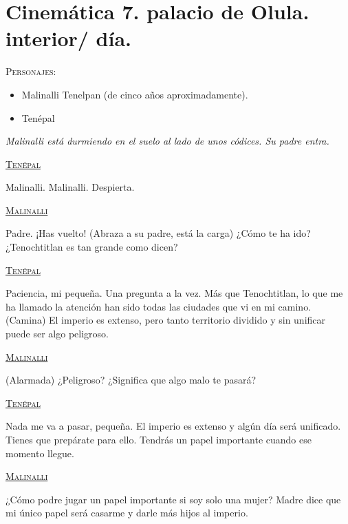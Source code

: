 \section{Cinemática 7. palacio de Olula. interior/ día.}
\label{Cin:Cinematica07}
\textsc{Personajes}:
\begin{itemize}
 \item Malinalli Tenelpan (de cinco años aproximadamente).
	\item Tenépal
\end{itemize}

\textit{Malinalli está durmiendo en el suelo al lado de unos códices. Su padre entra.} 

\begin{center}
\textsc{\underline{Tenépal }}
\\
\par
Malinalli. Malinalli. Despierta. 
\\
\par
\textsc{\underline{Malinalli}}
\\
\par
Padre. ¡Has vuelto! (Abraza a su padre, está la carga) ¿Cómo te ha ido? ¿Tenochtitlan es tan grande como dicen?
\\
\par 
\textsc{\underline{Tenépal }}
\\
\par
Paciencia, mi pequeña. Una pregunta a la vez. Más que Tenochtitlan, lo que me ha llamado la atención han sido todas las ciudades que vi en mi camino. (Camina) El imperio es extenso, pero tanto territorio dividido y sin unificar puede ser algo peligroso.
\\
\par
\textsc{\underline{Malinalli}}
\\
\par
(Alarmada) ¿Peligroso? ¿Significa que algo malo te pasará?
\\
\par
\textsc{\underline{Tenépal }}
\\
\par
Nada me va a pasar, pequeña. El imperio es extenso y algún día será unificado. Tienes que prepárate para ello. Tendrás un papel importante cuando ese momento llegue.
\\
\par
\textsc{\underline{Malinalli}}
\\
\par
¿Cómo podre jugar un papel importante si soy solo una mujer? Madre dice que mi único papel será casarme y darle más hijos al imperio.

\end{center}
